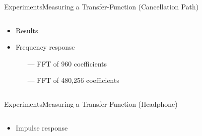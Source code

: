 \begin{frame}{Experiments}{Measuring a Transfer-Function (Cancellation Path)}		
	\begin{columns}
		\begin{column}{0.3\textwidth}
			\begin{itemize}
				\item Results
				\item Frequency response
				\begin{itemize}
					\item[\textcolor{MATLABorange}{---}] FFT of 960 coefficients
					\item[\textcolor{MATLABblue}{---}] FFT of 480,256 coefficients
				\end{itemize}
			\end{itemize}
		\end{column}
		\begin{column}{0.7\textwidth} 
			\begin{figure}[h]
				
			\end{figure}
		\end{column}
	\end{columns}
\end{frame}
\begin{frame}{Experiments}{Measuring a Transfer-Function (Headphone)}		
	\begin{columns}
		\begin{column}{1\textwidth}
			\begin{itemize}
				\item Impulse response
			\end{itemize}
			\begin{figure}[h]
				
			\end{figure}
		\end{column}
	\end{columns}
\end{frame}


